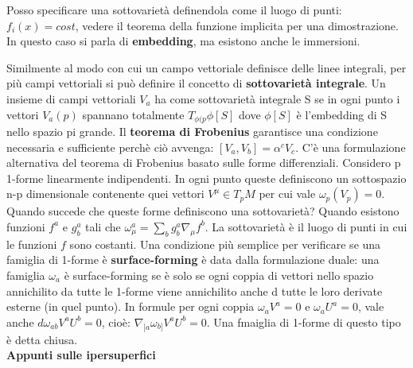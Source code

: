 \documentclass[10pt,a4paper]{article}
\begin{document}
Posso specificare una sottovarietà definendola come il luogo di punti: $f_i (x) = cost$, vedere il teorema della funzione implicita per una dimostrazione. In questo caso si parla di \textbf{embedding}, ma esistono anche le immersioni.

Similmente al modo con cui un campo vettoriale definisce delle linee integrali, per più campi vettoriali si può definire il concetto di \textbf{sottovarietà integrale}. Un insieme di campi vettoriali $V_a$ ha come sottovarietà integrale S se in ogni punto i vettori ${V_a(p)}$ spannano totalmente $T_{\phi(p} \phi[S]$ dove $\phi[S]$ è l'embedding di S nello spazio pi grande. Il \textbf{teorema di Frobenius} garantisce una condizione necessaria e sufficiente perchè ciò avvenga: $[V_a, V_b]=\alpha^{c} V_c$. C'è una formulazione alternativa del teorema di Frobenius basato sulle forme differenziali. Considero p 1-forme linearmente indipendenti. In ogni punto queste definiscono un sottospazio n-p dimensionale contenente quei vettori $V^{\mu} \in T_p M$ per cui vale $\omega_p (V_p) = 0$. Quando succede che queste forme definiscono una sottovarietà? Quando esistono funzioni $f^a$ e $g_{b}^a$ tali che $\omega_{\mu}^a = \sum_{b} g_{b}^a \nabla_{\mu} f^b$. La sottovarietà è il luogo di punti in cui le funzioni $f$ sono costanti. Una condizione più semplice per verificare se una famiglia di 1-forme è \textbf{surface-forming} è data dalla formulazione duale: una famiglia ${\omega_a}$ è surface-forming se è solo se ogni coppia di vettori nello spazio annichilito da tutte le 1-forme viene annichilito anche d tutte le loro derivate esterne (in quel punto). In formule per ogni coppia $\omega_a V^{a} = 0$ e $\omega_a U^{a} = 0$, vale anche $d \omega_{ab} V^{a} U^{b} = 0$, cioè: $\nabla_{[a} \omega_{b]} V^{a} U^{b} = 0$. Una fmaiglia di 1-forme di questo tipo è detta chiusa.\\

\textbf{Appunti sulle ipersuperfici}
\end{document}
